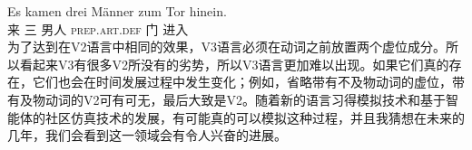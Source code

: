 \ea
\gll Es kamen drei Männer zum Tor hinein.\\
     \expl{} 来 三 男人 \textsc{prep}.\textsc{art}.\textsc{def} 门 进入\\
\z
为了达到在V2语言中相同的效果，V3语言必须在动词之前放置两个虚位成分。所以看起来V3有很多V2所没有的劣势，所以V3语言更加难以出现。如果它们真的存在，它们也会在时间发展过程中发生变化；例如，省略带有不及物动词的虚位，带有及物动词的V2可有可无，最后大致是V2。随着新的语言习得模拟技术和基于智能体的社区仿真技术的发展，有可能真的可以模拟这种过程，并且我猜想在未来的几年，我们会看到这一领域会有令人兴奋的进展。

